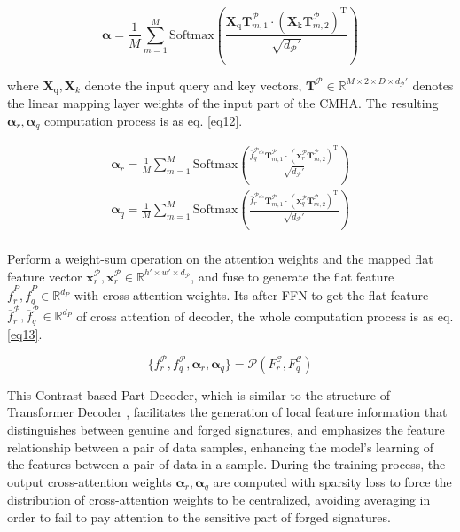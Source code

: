 \begin{equation}
\label{eq11}
  \boldsymbol{\alpha}= \frac{1}{M}\sum^M_{m=1} \text{Softmax}\left( \frac{\boldsymbol{X}_\text{q}\mathbf{T}^\mathcal{P}_{m, 1}\cdot (\boldsymbol{X}_\text{k}\mathbf{T}^\mathcal{P}_{m, 2})^\mathrm{T} }{\sqrt{d_\mathcal{P}'}} \right)
\end{equation}

where $\boldsymbol{X}_\text{q},\boldsymbol{X}_k$ denote the input query and key vectors, $\mathbf{T}^\mathcal{P} \in \mathbb{R}^{M\times 2\times D\times d_{\mathcal{P}}'}$ denotes the linear mapping layer weights of the input part of the CMHA. The resulting $\boldsymbol{\alpha}_r,\boldsymbol{\alpha}_q$ computation process is as eq. \ref{eq12}.

\begin{equation}
\label{eq12}
\begin{aligned}
  \boldsymbol{\alpha}_r = \frac{1}{M}\sum^M_{m=1} \text{Softmax}\left( \frac{\overline{f}_q^{\mathcal{P}_{cls}}\mathbf{T}^\mathcal{P}_{m, 1}\cdot (\boldsymbol{x}_r^\mathcal{P}\mathbf{T}^\mathcal{P}_{m, 2})^\mathrm{T} }{\sqrt{d_\mathcal{P}'}} \right) \\
  \boldsymbol{\alpha}_q = \frac{1}{M}\sum^M_{m=1} \text{Softmax}\left( \frac{\overline{f}_r^{\mathcal{P}_{cls}}\mathbf{T}^\mathcal{P}_{m, 1}\cdot (\boldsymbol{x}_q^\mathcal{P}\mathbf{T}^\mathcal{P}_{m, 2})^\mathrm{T} }{\sqrt{d_\mathcal{P}'}} \right) \\
\end{aligned}
\end{equation}

Perform a weight-sum operation on the attention weights and the mapped flat feature vector $\overline{\boldsymbol{x}}_r^\mathcal{P},\overline{\boldsymbol{x}}_r^\mathcal{P}\in \mathbb{R}^{h'\times w'\times d_\mathcal{P}}$, and fuse to generate the flat feature $\overline{f}_r^P,\overline{f}_q^P\in \mathbb{R}^{d_P}$ with cross-attention weights. Its after FFN to get the flat feature $\overline{f}_r^\mathcal{P},\overline{f}_q^\mathcal{P}\in \mathbb{R}^{d_P}$ of cross attention of decoder, the whole computation process is as eq. \ref{eq13}.

\begin{equation}
\label{eq13}
  \{f_r^\mathcal{P},f_q^\mathcal{P},\boldsymbol{\alpha}_r,\boldsymbol{\alpha}_q \}=\mathcal{P}(F_r^\mathcal{C},F_q^\mathcal{C} )
\end{equation}

This Contrast based Part Decoder, which is similar to the structure of Transformer Decoder \cite{36}, facilitates the generation of local feature information that distinguishes between genuine and forged signatures, and emphasizes the feature relationship between a pair of data samples, enhancing the model's learning of the features between a pair of data in a sample. During the training process, the output cross-attention weights $\boldsymbol{\alpha}_r,\boldsymbol{\alpha}_q$ are computed with sparsity loss to force the distribution of cross-attention weights to be centralized, avoiding averaging in order to fail to pay attention to the sensitive part of forged signatures.

